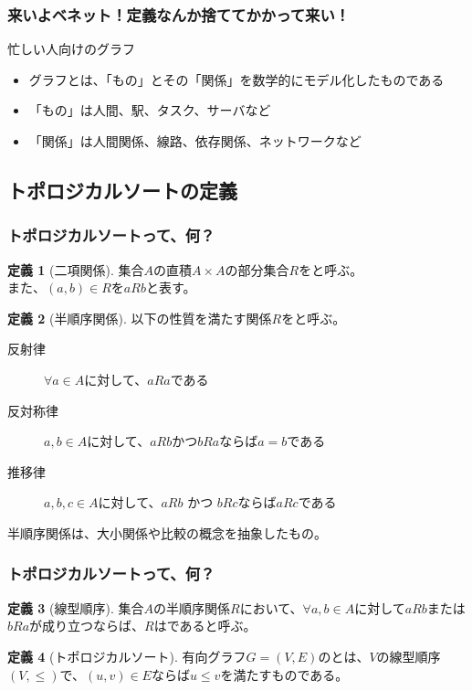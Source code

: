 \documentclass[aspectratio=169,dvipdfmx,12pt,notheorems]{beamer}
\theoremstyle{definition}
\newtheorem{definition}{定義}
\begin{document}
\begin{frame}\frametitle{来いよベネット！定義なんか捨ててかかって来い！}

\begin{block}{忙しい人向けのグラフ}
\begin{itemize}
\item グラフとは、「もの」とその「関係」を数学的にモデル化したものである
\item 「もの」は人間、駅、タスク、サーバなど
\item 「関係」は人間関係、線路、依存関係、ネットワークなど
\end{itemize}
\end{block}

\end{frame}

\subsection{トポロジカルソートの定義}

\begin{frame}\frametitle{トポロジカルソートって、何？}

\begin{definition}[二項関係]
集合$A$の直積$A\times A$の部分集合$R$をと呼ぶ。 \\
また、$(a, b) \in R$を$aRb$と表す。
\end{definition}

\begin{definition}[半順序関係]
以下の性質を満たす関係$R$をと呼ぶ。
\begin{description}
\item[反射律] $\forall a \in A$に対して、$aRa$である
\item[反対称律] $a, b \in A$に対して、$aRb$かつ$bRa$ならば$a=b$である
\item[推移律] $a, b, c \in A$に対して、$aRb$ かつ $bRc$ならば$aRc$である
\end{description}
\end{definition}
半順序関係は、大小関係や比較の概念を抽象したもの。
\end{frame}

\begin{frame}\frametitle{トポロジカルソートって、何？}

\begin{definition}[線型順序]
集合$A$の半順序関係$R$において、$\forall a, b \in A$に対して$aRb$または$bRa$が成り立つならば、$R$はであると呼ぶ。
\end{definition}

\begin{definition}[トポロジカルソート]
有向グラフ$G=(V, E)$のとは、$V$の線型順序$(V, \leq)$で、$(u, v) \in E$ならば$u \leq v$を満たすものである。
\end{definition}

\end{frame}
\end{document}
